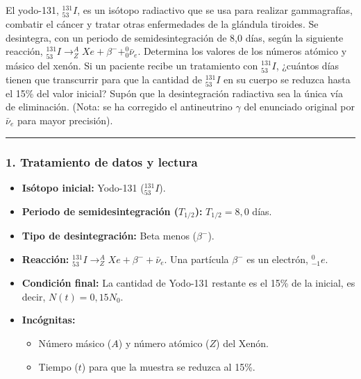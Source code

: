 \begin{cajaenunciado}
El yodo-131, $^{131}_{53}I$, es un isótopo radiactivo que se usa para realizar gammagrafías, combatir el cáncer y tratar otras enfermedades de la glándula tiroides. Se desintegra, con un periodo de semidesintegración de 8,0 días, según la siguiente reacción, $^{131}_{53}I\rightarrow^{A}_{Z}Xe+\beta^{-}+^{0}_{0}\bar{\nu}_e$. Determina los valores de los números atómico y másico del xenón. Si un paciente recibe un tratamiento con $^{131}_{53}I$, ¿cuántos días tienen que transcurrir para que la cantidad de $^{131}_{53}I$ en su cuerpo se reduzca hasta el 15\% del valor inicial? Supón que la desintegración radiactiva sea la única vía de eliminación. (Nota: se ha corregido el antineutrino $\gamma$ del enunciado original por $\bar{\nu}_e$ para mayor precisión).
\end{cajaenunciado}
\hrule

\subsubsection*{1. Tratamiento de datos y lectura}
\begin{itemize}
    \item \textbf{Isótopo inicial:} Yodo-131 ($^{131}_{53}I$).
    \item \textbf{Periodo de semidesintegración ($T_{1/2}$):} $T_{1/2} = 8,0$ días.
    \item \textbf{Tipo de desintegración:} Beta menos ($\beta^{-}$).
    \item \textbf{Reacción:} $^{131}_{53}I \rightarrow ^{A}_{Z}Xe + \beta^{-} + \bar{\nu}_e$. Una partícula $\beta^-$ es un electrón, $^{0}_{-1}e$.
    \item \textbf{Condición final:} La cantidad de Yodo-131 restante es el 15\% de la inicial, es decir, $N(t) = 0,15 N_0$.
    \item \textbf{Incógnitas:}
        \begin{itemize}
            \item Número másico ($A$) y número atómico ($Z$) del Xenón.
            \item Tiempo ($t$) para que la muestra se reduzca al 15\%.
        \end{itemize}
\end{itemize}

